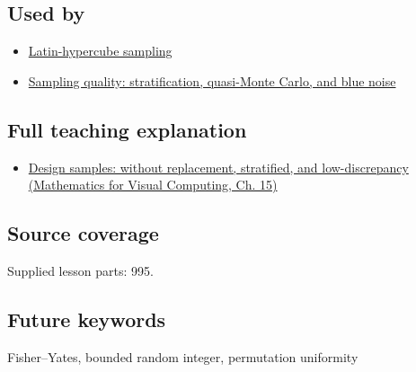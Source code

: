 \subsection{Used by}\label{appendix-184fcc411663-used-by}

\hypertarget{appendix-184fcc411663-used-by}{}

\begin{itemize}
\tightlist
\item
  \hyperref[appendix-1c5e85693a06]{Latin-hypercube sampling}
\item
  \hyperref[appendix-9f693ffd82bc]{Sampling quality: stratification, quasi-Monte Carlo, and blue noise}
\end{itemize}

\subsection{Full teaching explanation}\label{appendix-184fcc411663-full-teaching-explanation}

\hypertarget{appendix-184fcc411663-full-teaching-explanation}{}

\begin{itemize}
\tightlist
\item
  \href{../02-Mathematics-for-Visual-Computing/main.pdf\#nameddest=02-foundations-ii-ch031-design-samples-without-replacement-stratified-and-low-discrepancy}{Design samples: without replacement, stratified, and low-discrepancy (Mathematics for Visual Computing, Ch. 15)}
\end{itemize}

\subsection{Source coverage}\label{appendix-184fcc411663-source-coverage}

\hypertarget{appendix-184fcc411663-source-coverage}{}

Supplied lesson parts: 995.

\subsection{Future keywords}\label{appendix-184fcc411663-future-keywords}

\hypertarget{appendix-184fcc411663-future-keywords}{}

Fisher--Yates, bounded random integer, permutation uniformity

